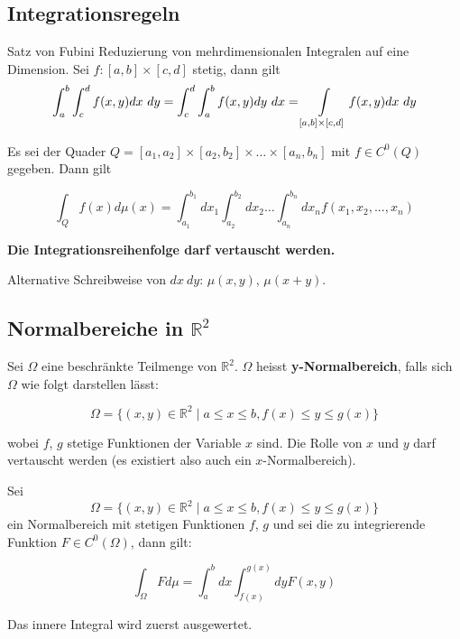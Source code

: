 \subsection{Integrationsregeln}

\begin{Satz}{Satz von Fubini}{}
    Reduzierung von mehrdimensionalen Integralen auf eine Dimension. Sei $f: [a,b] \times [c, d]$ stetig, dann gilt
    \[ \int_a^b \int_c^d f(x, y) dx ~ dy = \int_c^d \int_a^b f(x, y) dy ~ dx = \int\displaylimits_{[a,b] \times [c, d]} f(x, y) dx ~ dy   \]

    Es sei der Quader $Q = [a_1,a_2] \times [a_2, b_2] \times \dots \times [a_n, b_n]$ mit $f \in C^0(Q)$ gegeben. Dann gilt

    \[
        \int_Q f(x) d\mu(x) = \int_{a_1}^{b_1} dx_1 \int_{a_2}^{b_2} dx_2 \dots \int_{a_n}^{b_n} dx_n f(x_1, x_2,...,x_n)
    \]
    
    \textbf{Die Integrationsreihenfolge darf vertauscht werden.}
\end{Satz}

Alternative Schreibweise von $dx ~ dy$: $\mu(x, y)$, $\mu(x+y)$.

\subsection{Normalbereiche in $\mathbb{R}^2$}

Sei $\Omega$ eine beschränkte Teilmenge von $\mathbb{R}^2$. $\Omega$ heisst \textbf{y-Normalbereich}, falls sich $\Omega$ wie folgt darstellen lässt:

\[
    \Omega = \{(x, y) \in \mathbb{R}^2 \mid a \leq x \leq b, f(x) \leq y \leq g(x)\}
\]

wobei $f$, $g$ stetige Funktionen der Variable $x$ sind. Die Rolle von $x$ und $y$ darf vertauscht werden (es existiert also auch ein $x$-Normalbereich).

Sei \[\Omega = \{(x, y) \in \mathbb{R}^2 \mid a \leq x \leq b, f(x) \leq y \leq g(x)\}\] ein Normalbereich mit stetigen Funktionen $f$, $g$ und sei die zu integrierende Funktion $F \in C^0(\Omega)$, dann gilt:

\[
    \int_{\Omega} F d\mu = \int_a^b dx \int_{f(x)}^{g(x)} dy F(x, y)
\]

Das innere Integral wird zuerst ausgewertet.


